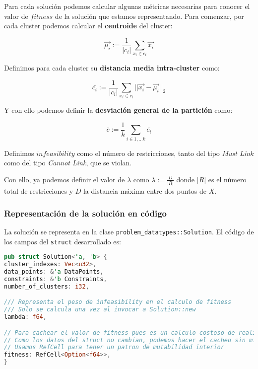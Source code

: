 \documentclass[11pt]{article}
\begin{document}
Para cada solución podemos calcular algunas métricas necesarias para conocer el valor de $fitness$ de la solución que estamos representando. Para comenzar, por cada cluster podemos calcular el \textbf{centroide} del cluster:

\begin{displaymath}
\vec{\mu_i} := \frac{1}{|c_i|} \sum_{x_i \in c_i} \vec{x_i}
\end{displaymath}

Definimos para cada cluster su \textbf{distancia media intra-cluster} como:

\begin{displaymath}
\bar{c_i} := \frac{1}{|c_i|} \sum_{x_i \in c_i} || \vec{x_i} - \vec{\mu_i} ||_2
\end{displaymath}

Y con ello podemos definir la \textbf{desviación general de la partición} como:

\begin{displaymath}
\bar{c} := \frac{1}{k} \sum_{i \in 1, \ldots k} \bar{c_i}
\end{displaymath}

Definimos $infeasibility$ como el número de restricciones, tanto del tipo \emph{Must Link} como del tipo \emph{Cannot Link}, que se violan.

Con ello, ya podemos definir el valor de $\lambda$ como $\lambda := \frac{D}{|R|}$ donde $|R|$ es el número total de restricciones y $D$ la distancia máxima entre dos puntos de $X$.


\subsubsection{Representación de la solución en código}

La solución se representa en la clase \lstinline{problem_datatypes::Solution}. El código de los campos del \lstinline{struct} desarrollado es:

\begin{lstlisting}[language=Rust, style=Boxed]
pub struct Solution<'a, 'b> {
cluster_indexes: Vec<u32>,
data_points: &'a DataPoints,
constraints: &'b Constraints,
number_of_clusters: i32,

/// Representa el peso de infeasibility en el calculo de fitness
/// Solo se calcula una vez al invocar a Solution::new
lambda: f64,

// Para cachear el valor de fitness pues es un calculo costoso de realizar
// Como los datos del struct no cambian, podemos hacer el cacheo sin miedo
// Usamos RefCell para tener un patron de mutabilidad interior
fitness: RefCell<Option<f64>>,
}
\end{lstlisting}
\end{document}
